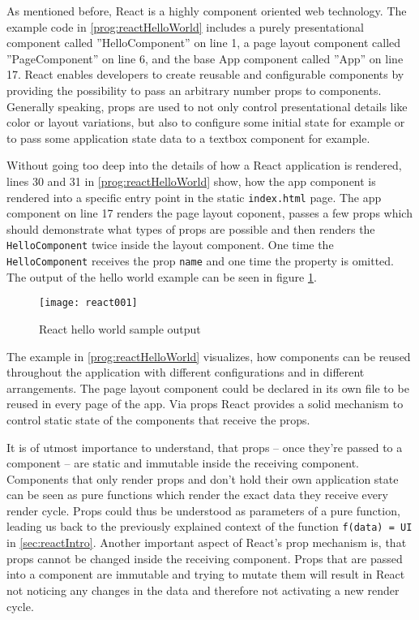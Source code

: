 As mentioned before, React is a highly component oriented web technology. The example code in \ref{prog:reactHelloWorld} includes a purely presentational component called ''HelloComponent'' on line 1, a page layout component called ''PageComponent'' on line 6, and the base App component called ''App'' on line 17. React enables developers to create reusable and configurable components by providing the possibility to pass an arbitrary number props to components. Generally speaking, props are used to not only control presentational details like color or layout variations, but also to configure some initial state for example or to pass some application state data to a textbox component for example.

Without going too deep into the details of how a React application is rendered, lines 30 and 31 in \ref{prog:reactHelloWorld} show, how the app component is rendered into a specific entry point in the static \texttt{index.html} page. The app component on line 17 renders the page layout coponent, passes a few props which should demonstrate what types of props are possible and then renders the \texttt{HelloComponent} twice inside the layout component. One time the \texttt{HelloComponent} receives the prop \texttt{name} and one time the property is omitted. The output of the hello world example can be seen in figure \ref{fig:reactHelloWorld}. 

\begin{figure}
  \centering
  \texttt{[image: react001]}
  \caption{React hello world sample output}
  \label{fig:reactHelloWorld}
\end{figure}

The example in \ref{prog:reactHelloWorld} visualizes, how components can be reused throughout the application with different configurations and in different arrangements. The page layout component could be declared in its own file to be reused in every page of the app. Via props React provides a solid mechanism to control static state of the components that receive the props.

It is of utmost importance to understand, that props -- once they're passed to a component -- are static and immutable inside the receiving component. Components that only render props and don't hold their own application state can be seen as pure functions which render the exact data they receive every render cycle. Props could thus be understood as parameters of a pure function, leading us back to the previously explained context of the function \texttt{f(data) = UI} in \ref{sec:reactIntro}. Another important aspect of React's prop mechanism is, that props cannot be changed inside the receiving component. Props that are passed into a component are immutable and trying to mutate them will result in React not noticing any changes in the data and therefore not activating a new render cycle.

